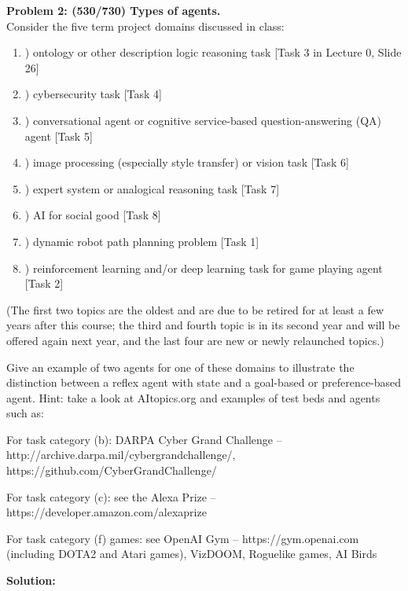 \documentclass{amsart}
\theoremstyle{definition}
\begin{document}
\textbf{Problem 2: (530/730) Types of agents.} \\
Consider the five term project domains discussed in class:
\begin{enumerate}[label=\alph*]
\item) ontology or other description logic reasoning task [Task 3 in Lecture 0, Slide 26]
\item) cybersecurity task [Task 4]
\item) conversational agent or cognitive service-based question-answering (QA) agent [Task 5]
\item) image processing (especially style transfer) or vision task [Task 6]
\item) expert system or analogical reasoning task [Task 7]
\item) AI for social good [Task 8]
\item) dynamic robot path planning problem [Task 1]
\item) reinforcement learning and/or deep learning task for game playing agent [Task 2]
\end{enumerate}
(The first two topics are the oldest and are due to be retired for at least a few years after this course; the third and fourth topic is in its second year and will be offered again next year, and the last four are new or newly relaunched topics.)

Give an example of two agents for one of these domains to illustrate the distinction between
a reflex agent with state and a goal-based or preference-based agent. Hint: take a look at AItopics.org and examples of test beds and agents such as:

For task category (b): DARPA Cyber Grand Challenge – http://archive.darpa.mil/cybergrandchallenge/, https://github.com/CyberGrandChallenge/

For task category (c): see the Alexa Prize – https://developer.amazon.com/alexaprize

For task category (f) games: see OpenAI Gym – https://gym.openai.com (including DOTA2 and Atari games), VizDOOM, Roguelike games, AI Birds


\bigbreak

\textbf{Solution:}



\newpage
\end{document}
